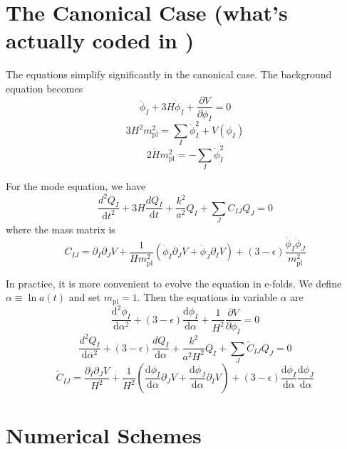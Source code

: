 \documentclass[11pt]{article}
\newcommand{\mpl}{m_{\mathrm{pl}}}
\newcommand{\ud}{\mathrm{d}}
\newcommand{\pd}{\partial}
\def\tilC{{\tilde C}}
\begin{document}
\section{The Canonical Case (what's actually coded in )}

The equations simplify significantly in the canonical case. The background equation becomes 
\begin{equation}
\ddot{\phi}_I + 3H \dot{\phi}_I + \frac{\pd V}{\pd \phi_I} = 0  
\end{equation}
\begin{equation}\label{eq_H}
3H^2 \mpl^2 = \sum_I \dot{\phi}_I^2 + V(\phi_I)
\end{equation}
\begin{equation}
2\dot{H} \mpl^2 = -\sum_I \dot{\phi}_I^2
\end{equation}

For the mode equation, we have
\begin{equation}
\frac{d^2 Q_I}{\ud t^2} + 3H \frac{d Q_I}{\ud t} + \frac{k^2}{a^2} Q_I + \sum_J C_{IJ} Q_J = 0
\end{equation}
where the mass matrix is
\begin{equation}
C_{IJ} = \pd_I\pd_J V + \frac{1}{H \mpl^2} \left( \dot{\phi}_I \pd_J V + \dot{\phi}_J \pd_I V \right)
+ (3-\epsilon) \frac{\dot{\phi}_I\dot{\phi}_J}{\mpl^2}
\label{eqn:massmatrix}
\end{equation}

In practice, it is more convenient to evolve the equation in e-folds. We define $\alpha \equiv \ln a(t)$ and set $\mpl = 1$. 
Then the equations in variable $\alpha$ are 
\begin{equation}\label{eq_bk}
\frac{\ud^2 \phi_I}{\ud \alpha^2 } + (3 -\epsilon) \frac{\ud \phi_I}{\ud \alpha} + \frac{1}{H^2}\frac{\pd V}{\pd \phi_I} = 0  
\end{equation}
\begin{equation}
\frac{d^2 Q_I}{\ud \alpha^2} + (3-\epsilon) \frac{d Q_I}{\ud \alpha} + \frac{k^2}{a^2H^2} Q_I + \sum_J \tilC_{IJ} Q_J = 0
\end{equation}
\begin{equation}\label{cij}
\tilC_{IJ} = \frac{\pd_I\pd_J V}{H^2} + \frac{1}{H^2} \left(\frac{\ud \phi_I}{\ud \alpha} \pd_J V  +  \frac{\ud \phi_J}{\ud \alpha} \pd_I V \right)
+ (3-\epsilon) \frac{\ud \phi_I}{\ud \alpha} \frac{\ud \phi_J}{\ud \alpha}
\end{equation}

\section{Numerical Schemes}
\end{document}
